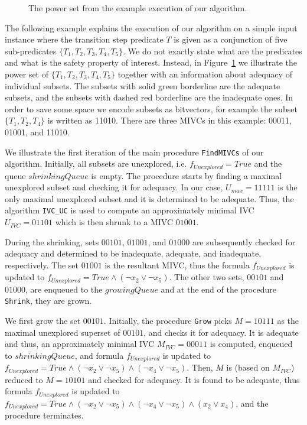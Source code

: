 \begin{figure}[t]\label{fig:running_cube}
\centering

\caption{The power set from the example execution of our algorithm.}
\end{figure}

The following example explains the execution of our algorithm on a simple input instance where the transition step predicate $T$ is given as a conjunction of five sub-predicates $\{T_1, T_2, T_3, T_4, T_5\}$. We do not exactly state what are the predicates and what is the safety property of interest. Instead, in Figure~\ref{fig:running_cube} we illustrate the power set of $\{T_1, T_2, T_3, T_4, T_5\}$ together with an information about adequacy of individual subsets. The subsets with solid green borderline are the adequate subsets, and the subsets with dashed red borderline are the inadequate ones. In order to save some space we encode subsets as bitvectors, for example the subset $\{T_1, T_2, T_4\}$ is written as 11010. There are three MIVCs in this example: 00011, 01001, and 11010. 

We illustrate the first iteration of the main procedure \texttt{FindMIVCs} of our algorithm. Initially, all subsets are unexplored, i.e. $f_{\mathit{Unexplored}} = True$ and the queue $\mathit{shrinkingQueue}$ is empty. The procedure starts by finding a maximal unexplored subset and checking it for adequacy. In our case, $U_{\mathit{max}} = 11111$ is the only maximal unexplored subset and it is determined to be adequate. Thus, the algorithm \texttt{IVC\_UC} is used to compute an approximately minimal IVC $U_{\mathit{IVC}} = 01101$ which is then shrunk to a MIVC $01001$. 

During the shrinking, sets $00101$, $01001$, and $01000$ are subsequently checked for adequacy and determined to be inadequate, adequate, and inadequate, respectively. The set $01001$ is the resultant MIVC, thus the formula $f_{\mathit{Unexplored}}$ is updated to $f_{\mathit{Unexplored}} = \mathit{True} \wedge (\neg x_2 \vee \neg x_5)$. The other two sets, $00101$ and $01000$, are enqueued to the $\mathit{growingQueue}$ and at the end of the procedure \texttt{Shrink}, they are grown.

We first grow the set $00101$. Initially, the procedure \texttt{Grow} picks $M = 10111$ as the maximal unexplored superset of $00101$, and checks it for adequacy. It is adequate and thus, an approximately minimal IVC $M_{\mathit{IVC}} = 00011$ is computed, enqueued to $\mathit{shrinkingQueue}$, and formula $f_{\mathit{Unexplored}}$ is updated to $f_{\mathit{Unexplored}} = \mathit{True} \wedge (\neg x_2 \vee \neg x_5) \wedge	(\neg x_4 \vee \neg x_5)$. Then, $M$ is (based on $M_{\mathit{IVC}}$) reduced to $M = 10101$ and checked for adequacy. It is found to be adequate, thus formula $f_{\mathit{Unexplored}}$ is updated to $f_{\mathit{Unexplored}} = \mathit{True} \wedge (\neg x_2 \vee \neg x_5) \wedge	(\neg x_4 \vee \neg x_5) \wedge (x_2 \vee x_4)$, and the procedure terminates.  

